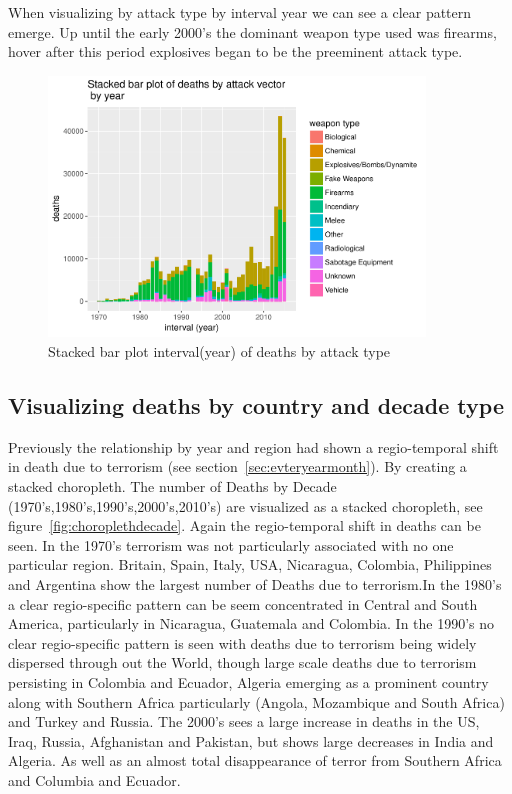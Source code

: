 When visualizing by attack type by interval year we can see a clear pattern emerge. Up until the early 2000's the dominant weapon type used was firearms, hover after this period explosives began to be the preeminent attack type. 

\begin{figure}[t]
\includegraphics[width=10cm]{Peters_experiment_markdown_files/figure-latex/unnamed-chunk-9-1.pdf}
\caption{Stacked bar plot interval(year) of deaths by attack type}
\label{fig:stackbaryearweaptype}
\centering
\end{figure}

\subsection{Visualizing deaths by country and decade 
type}\label{viewing-deaths-by-attack-vector-type}

Previously the relationship by year and region had shown a regio-temporal shift in death due to terrorism (see section~\ref{sec:evteryearmonth}). By creating a stacked choropleth. The number of Deaths by Decade (1970's,1980's,1990's,2000's,2010's) are visualized as a stacked choropleth, see figure~\ref{fig:choroplethdecade}. Again the regio-temporal shift in deaths can be seen. In the 1970's terrorism was not particularly associated with no one particular region. Britain, Spain, Italy, USA, Nicaragua, Colombia, Philippines and Argentina show the largest number of Deaths due to terrorism.In the 1980's a clear regio-specific pattern can be seem concentrated in Central and South America, particularly in Nicaragua, Guatemala and Colombia.
In the 1990's no clear regio-specific pattern is seen with deaths due to terrorism being widely dispersed through out the World, though large scale deaths due to terrorism persisting in Colombia and Ecuador, Algeria emerging as a prominent country along with Southern Africa particularly (Angola, Mozambique and  South Africa) and  Turkey and Russia. 
The 2000's sees a large increase in deaths in the US, Iraq, Russia, Afghanistan and Pakistan, but shows large decreases in India and Algeria. As well as an almost total disappearance of terror from Southern Africa and Columbia and Ecuador.

